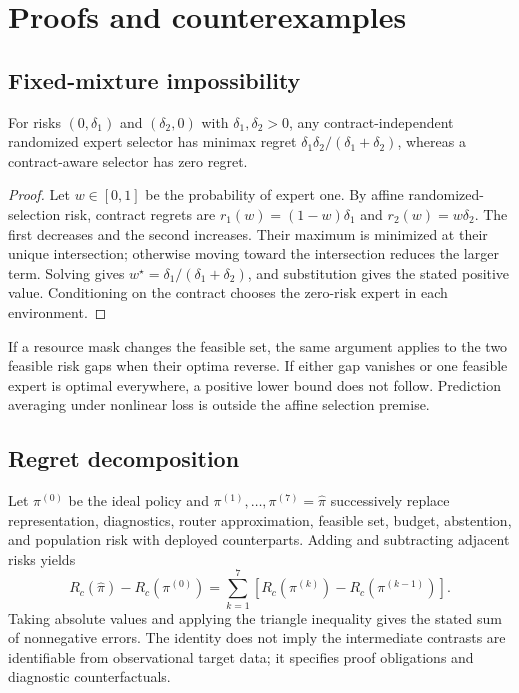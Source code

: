 \section{Proofs and counterexamples}

\subsection{Fixed-mixture impossibility}
\begin{theorem}
For risks \((0,\delta_1)\) and \((\delta_2,0)\) with \(\delta_1,\delta_2>0\), any contract-independent randomized expert selector has minimax regret \(\delta_1\delta_2/(\delta_1+\delta_2)\), whereas a contract-aware selector has zero regret.
\end{theorem}
\begin{proof}
Let \(w\in[0,1]\) be the probability of expert one. By affine randomized-selection risk, contract regrets are \(r_1(w)=(1-w)\delta_1\) and \(r_2(w)=w\delta_2\). The first decreases and the second increases. Their maximum is minimized at their unique intersection; otherwise moving toward the intersection reduces the larger term. Solving gives \(w^\star=\delta_1/(\delta_1+\delta_2)\), and substitution gives the stated positive value. Conditioning on the contract chooses the zero-risk expert in each environment.
\end{proof}
If a resource mask changes the feasible set, the same argument applies to the two feasible risk gaps when their optima reverse. If either gap vanishes or one feasible expert is optimal everywhere, a positive lower bound does not follow. Prediction averaging under nonlinear loss is outside the affine selection premise.

\subsection{Regret decomposition}
Let \(\pi^{(0)}\) be the ideal policy and \(\pi^{(1)},\ldots,\pi^{(7)}=\hat\pi\) successively replace representation, diagnostics, router approximation, feasible set, budget, abstention, and population risk with deployed counterparts. Adding and subtracting adjacent risks yields
\[
R_c(\hat\pi)-R_c(\pi^{(0)})=\sum_{k=1}^{7}\left[R_c(\pi^{(k)})-R_c(\pi^{(k-1)})\right].
\]
Taking absolute values and applying the triangle inequality gives the stated sum of nonnegative errors. The identity does not imply the intermediate contrasts are identifiable from observational target data; it specifies proof obligations and diagnostic counterfactuals.

